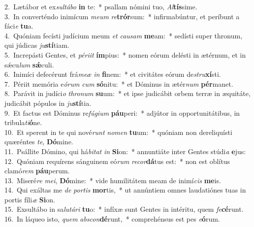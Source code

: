 {2.~}Lætábor et ex\textit{sul}\textit{tá}\textit{bo} \textbf{in} te:~* psallam nómini tuo, \textit{Al}\textbf{tís}sime.\\
{3.~}In converténdo inimícum \textit{me}\textit{um} \textit{re}\textbf{trór}sum:~* infirmabúntur, et períbunt a fáci\textit{e} \textbf{tu}a.\\
{4.~}Quóniam fecísti judícium meum \textit{et} \textit{cau}\textit{sam} \textbf{me}am:~* sedísti super thronum, qui júdicas \textit{ju}\textbf{stí}tiam.\\
{5.~}Increpásti Gentes, et \textit{pé}\textit{ri}\textit{it} \textbf{ím}pius:~* nomen eórum delésti in ætérnum, et in sǽcu\textit{lum} \textbf{sǽ}culi.\\
{6.~}Inimíci defecérunt frá\textit{me}\textit{æ} \textit{in} \textbf{fi}nem:~* et civitátes eórum de\textit{stru}\textbf{xí}sti.\\
{7.~}Périit memória e\textit{ó}\textit{rum} \textit{cum} \textbf{só}nitu:~* et Dóminus in ætér\textit{num} \textbf{pér}manet.\\
{8.~}Parávit in judíci\textit{o} \textit{thro}\textit{num} \textbf{su}um:~* et ipse judicábit orbem terræ in æquitáte, judicábit pópulos in \textit{ju}\textbf{stí}tia.\\
{9.~}Et factus est Dóminus re\textit{fú}\textit{gi}\textit{um} \textbf{páu}peri:~* adjútor in opportunitátibus, in tribula\textit{ti}\textbf{ó}ne.\\
{10.~}Et sperent in te qui nové\textit{runt} \textit{no}\textit{men} \textbf{tu}um:~* quóniam non dereliquísti quæréntes \textit{te}, \textbf{Dó}mine.\\
{11.~}Psállite Dómino, qui há\textit{bi}\textit{tat} \textit{in} \textbf{Si}on:~* annuntiáte inter Gentes stúdi\textit{a} \textbf{e}jus:\\
{12.~}Quóniam requírens sánguinem eó\textit{rum} \textit{re}\textit{cor}\textbf{dá}tus est:~* non est oblítus clamó\textit{rem} \textbf{páu}perum.\\
{13.~}Miseré\textit{re} \textit{me}\textit{i}, \textbf{Dó}mine:~* vide humilitátem meam de inimí\textit{cis} \textbf{me}is.\\
{14.~}Qui exáltas me \textit{de} \textit{por}\textit{tis} \textbf{mor}tis,~* ut annúntiem omnes laudatiónes tuas in portis fíli\textit{æ} \textbf{Si}on.\\
{15.~}Exsultábo in sa\textit{lu}\textit{tá}\textit{ri} \textbf{tu}o:~* infíxæ sunt Gentes in intéritu, quem \textit{fe}\textbf{cé}runt.\\
{16.~}In láqueo isto, \textit{quem} \textit{ab}\textit{scon}\textbf{dé}runt,~* comprehénsus est pes \textit{e}\textbf{ó}rum.\\

